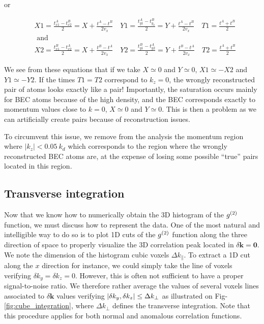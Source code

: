 \noindent or 

\begin{equation}
\begin{aligned}
&X 1=\frac{t_{x 1}^{A}-t_{x 2}^{B}}{2}=X+\frac{t^{A}-t^{B}}{2 v_{x}} \quad Y 1=\frac{t_{y 1}^{A}-t_{y_{2}}^{B}}{2}=Y+\frac{t^{A}-t^{B}}{2 v_{x}} \quad T 1=\frac{t^{A}+t^{B}}{2}\\
&\text { and }\\
&X 2=\frac{t_{x 1}^{B}-t_{x 2}^{A}}{2}=X+\frac{t^{B}-t^{A}}{2 v_{x}} \quad Y 2=\frac{t_{y 1}^{B}-t_{y 2}^{A}}{2}=Y+\frac{t^{B}-t^{A}}{2 v_{x}} \quad T 2=\frac{t^{A}+t^{B}}{2}
\end{aligned}
\end{equation}

\noindent We see from these equations that if we take $X \simeq 0$ and $Y \simeq 0$, $X1 \simeq -X2$ and $Y1 \simeq -Y2$. If the times $T1=T2$ correspond to $k_z=0$, the wrongly reconstructed pair of atoms looks exactly like a \kmk pair! Importantly, the saturation occurs mainly for BEC atoms because of the high density, and the BEC corresponds exactly to momentum values close to $k=0$, \ie  $X \simeq 0$ and $Y \simeq 0$. This is then a problem as we can artificially create \kmk pairs because of reconstruction issues.

To circumvent this issue, we remove from the analysis the momentum region where $|k_z| < 0.05 \ k_d$ which corresponds to the region where the wrongly reconstructed BEC atoms are, at the expense of losing some possible ``true'' pairs located in this region.


\subsection{Transverse integration}

\label{sec:transverse_integration}

Now that we know how to numerically obtain the 3D histogram of the $g^{(2)}$ function, we must discuss how to represent the data. One of the most natural and intelligible way to do so is to plot 1D cuts of the $g^{(2)}$ function along the three direction of space to properly visualize the 3D correlation peak located in $\delta \bm{k} = \bm{0}$. We note the dimension of the histogram cubic voxels $\Delta k_{\parallel}$. To extract a 1D cut along the $x$ direction for instance, we could simply take the line of voxels verifying $\delta k_y=\delta k_z =0$. However, this is often not sufficient to have a proper signal-to-noise ratio. We therefore rather average the values of several voxels lines associated to $\delta \bm{k}$ values verifying $\left\lvert\delta k_y, \delta k_z\right\rvert \leq \Delta k_{\perp}$ as illustrated on Fig-\ref{fig:cube_integration}, where $\Delta k_{\perp}$ defines the transverse integration. Note that this procedure applies for both normal and anomalous correlation functions.

